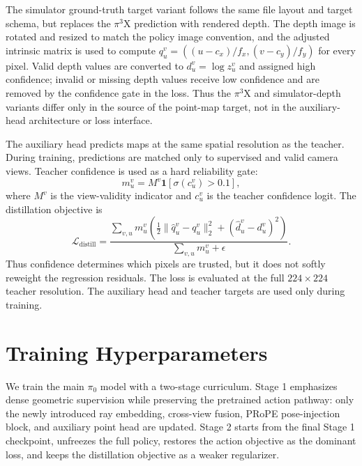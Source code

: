 The simulator ground-truth target variant follows the same file layout and target schema, but replaces the $\pi^3$X prediction with rendered depth. The depth image is rotated and resized to match the policy image convention, and the adjusted intrinsic matrix is used to compute $q_u^v=((u-c_x)/f_x,(v-c_y)/f_y)$ for every pixel. Valid depth values are converted to $d_u^v=\log z_u^v$ and assigned high confidence; invalid or missing depth values receive low confidence and are removed by the confidence gate in the loss. Thus the $\pi^3$X and simulator-depth variants differ only in the source of the point-map target, not in the auxiliary-head architecture or loss interface.

The auxiliary head predicts maps at the same spatial resolution as the teacher. During training, predictions are matched only to supervised and valid camera views. Teacher confidence is used as a hard reliability gate:
\begin{equation}
    m_u^v = M^v \mathbf{1}\left[\sigma(c_u^v) > 0.1\right],
\end{equation}
where $M^v$ is the view-validity indicator and $c_u^v$ is the teacher confidence logit. The distillation objective is
\begin{equation}
    \mathcal{L}_{\mathrm{distill}} =
    \frac{
        \sum_{v,u}m_u^v
        \left(
        \frac{1}{2}\lVert \hat{q}_u^v-q_u^v\rVert_2^2
        +(\hat{d}_u^v-d_u^v)^2
        \right)
    }{
        \sum_{v,u}m_u^v+\epsilon
    } .
\end{equation}
Thus confidence determines which pixels are trusted, but it does not softly reweight the regression residuals. The loss is evaluated at the full $224\times224$ teacher resolution. The auxiliary head and teacher targets are used only during training.

\section{Training Hyperparameters}
\label{app:training_details}

We train the main $\pi_0$ model with a two-stage curriculum. Stage 1 emphasizes dense geometric supervision while preserving the pretrained action pathway: only the newly introduced ray embedding, cross-view fusion, PRoPE pose-injection block, and auxiliary point head are updated. Stage 2 starts from the final Stage 1 checkpoint, unfreezes the full policy, restores the action objective as the dominant loss, and keeps the distillation objective as a weaker regularizer.

